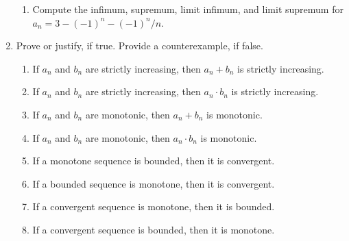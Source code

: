 \documentclass[12pt,letterpaper]{article}
\theoremstyle{case}
\theoremstyle{definition}
\begin{document}
\begin{enumerate}
\begin{enumerate}
		\item Compute the infimum, supremum, limit infimum, and limit supremum for $a_n = 3 - (-1)^n - (-1)^n/n$. 
	\end{enumerate}

	\item Prove or justify, if true. Provide a counterexample, if false.
	\begin{enumerate}
		\item If $a_n$ and $b_n$ are strictly increasing, then $a_n + b_n$ is strictly increasing.
		
		\item If $a_n$ and $b_n$ are strictly increasing, then $a_n \cdot b_n$ is strictly increasing.
		
		\item If $a_n$ and $b_n$ are monotonic, then $a_n + b_n$ is monotonic.
		
		\item If $a_n$ and $b_n$ are monotonic, then $a_n \cdot b_n$ is monotonic.
		
		\item If a monotone sequence is bounded, then it is convergent.
		
		\item If a bounded sequence is monotone, then it is convergent.
		
		\item If a convergent sequence is monotone, then it is bounded.
		
		\item If a convergent sequence is bounded, then it is monotone.
	\end{enumerate}
	\end{enumerate}
\end{document}

